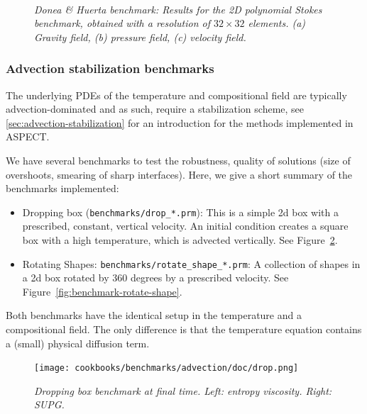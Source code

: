 \documentclass{article}
\newcommand{\aspect}{\textsc{ASPECT}}
\begin{document}
\begin{figure}[t!]
  \centering
  ~
  ~
  \caption{\it Donea \& Huerta benchmark: Results for the 2D polynomial Stokes benchmark,
obtained with a resolution of $32\times 32$ elements. (a) Gravity field, (b) pressure field,
(c) velocity field. }\label{fig:doneahuerta-benchmark}
\end{figure}


\subsubsection{Advection stabilization benchmarks}

The underlying PDEs of the temperature and compositional field are typically advection-dominated and as such, require a stabilization scheme, see \ref{sec:advection-stabilization} for
an introduction for the methods implemented in \aspect{}.

We have several benchmarks to test the robustness, quality of solutions (size of overshoots, smearing of sharp interfaces). Here, we give a short summary of the benchmarks implemented:
\begin{itemize}
 \item Dropping box (\texttt{benchmarks/drop\_*.prm}): This is a simple 2d box with a prescribed, constant, vertical velocity. An initial condition creates a square box with a high temperature, which is advected vertically. See Figure~\ref{fig:benchmark-drop}.

 \item Rotating Shapes: \texttt{benchmarks/rotate\_shape\_*.prm}: A collection of shapes in a 2d box
 rotated by 360 degrees by a prescribed velocity. See Figure~\ref{fig:benchmark-rotate-shape}.
\end{itemize}

Both benchmarks have the identical setup in the temperature and a compositional field. The only difference is that the temperature equation contains a (small) physical diffusion term.

\begin{figure}[t!]
  \centering
    \texttt{[image: cookbooks/benchmarks/advection/doc/drop.png]}%
  \caption{\it Dropping box benchmark at final time. Left: entropy viscosity. Right: SUPG.}\label{fig:benchmark-drop}
\end{figure}
\end{document}
